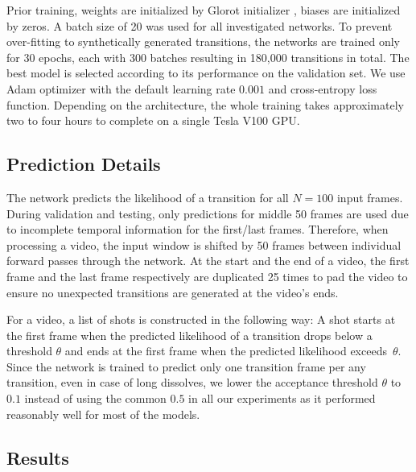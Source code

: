 Prior training, weights are initialized by Glorot initializer \cite{Xavier_Glorot_init}, biases are initialized by zeros. A batch size of 20 was used for all investigated networks. To prevent over-fitting to synthetically generated transitions, the networks are trained only for 30 epochs, each with 300 batches resulting in 180,000 transitions in total. The best model is selected according to its performance on the validation set. We use Adam optimizer \cite{Adam14} with the default learning rate $0.001$ and cross-entropy loss function. Depending on the architecture, the whole training takes approximately two to four hours to complete on a single Tesla V100 GPU.


\subsection{Prediction Details}
The network predicts the likelihood of a transition for all $N=100$ input frames. During validation and testing, only predictions for middle 50 frames are used due to incomplete temporal information for the first/last frames. Therefore, when processing a video, the input window is shifted by 50 frames between individual forward passes through the network. At the start and the end of a video, the first frame and the last frame respectively are duplicated 25 times to pad the video to ensure no unexpected transitions are generated at the video's ends.

For a video, a list of shots is constructed in the following way: A shot starts at the first frame when the predicted likelihood of a transition drops below a threshold $\theta$ and ends at the first frame when the predicted likelihood exceeds~$\theta$. Since the network is trained to predict only one transition frame per any transition, even in case of long dissolves, we lower the acceptance threshold $\theta$ to $0.1$ instead of using the common $0.5$ in all our experiments as it performed reasonably well for most of the models. 


\subsection{Results}\label{sec:transnetV1results}

